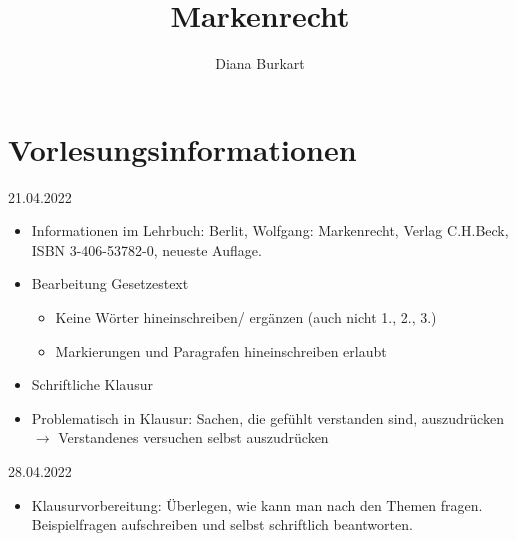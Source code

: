 \documentclass{report}
\title{Markenrecht}
\author{Diana Burkart}
\begin{document}
\maketitle
\newpage

\tableofcontents
\newpage

\section{Vorlesungsinformationen}
21.04.2022
\begin{itemize}
	\item Informationen im Lehrbuch: Berlit, Wolfgang: Markenrecht, Verlag C.H.Beck, ISBN 3-406-53782-0, neueste Auflage.
	\item Bearbeitung Gesetzestext
	\begin{itemize}
		\item Keine Wörter hineinschreiben/ ergänzen (auch nicht 1., 2., 3.)
		\item Markierungen und Paragrafen hineinschreiben erlaubt
	\end{itemize}
	\item Schriftliche Klausur
	\item Problematisch in Klausur:
	\newline Sachen, die gefühlt verstanden sind, auszudrücken $\rightarrow$ Verstandenes versuchen selbst auszudrücken
\end{itemize}
28.04.2022
\begin{itemize}
	\item Klausurvorbereitung: Überlegen, wie kann man nach den Themen fragen.
	\newline Beispielfragen aufschreiben und selbst schriftlich beantworten.
\end{itemize}
\newpage
\end{document}
